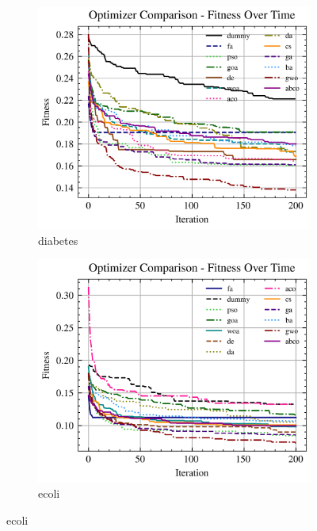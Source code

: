 \begin{figure}[htp]
    \begin{subfigure}[htp]{0.45\textwidth}
        \includegraphics[width=\textwidth]{imagenes/fitness_charts/img/binary/diabetes/optimizers_fitness_svc.png}
        \caption{diabetes}
    \end{subfigure}
    \begin{subfigure}[htp]{0.45\textwidth}
        \includegraphics[width=\textwidth]{imagenes/fitness_charts/img/binary/ecoli/optimizers_fitness_svc.png}
        \caption{ecoli}
    \end{subfigure}


\end{figure}

